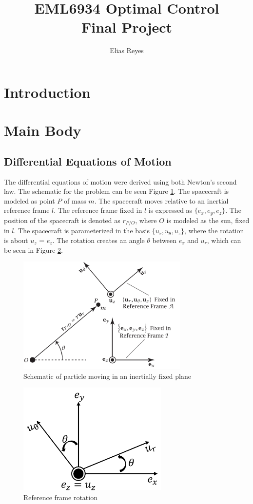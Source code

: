 \documentclass[]{article}
\title{EML6934 Optimal Control \\ Final Project}
\author{Elias Reyes}
\begin{document}
	
	\maketitle
	\thispagestyle{empty}
	\newpage
	\newpage
	\tableofcontents
	\newpage
	\listoffigures
	\listoftables
	\newpage
	\lstlistoflistings
	\newpage
	
	\section{Introduction}
	
	\section{Main Body}
	\subsection{Differential Equations of Motion}
	The differential equations of motion were derived using both Newton's second law. The schematic for the problem can be seen Figure \ref{fig:schematic}. The spacecraft is modeled as point \(P\) of  mass \(m\). The spacecraft moves relative to an inertial reference frame \(l\). The reference frame fixed in \(l\) is expressed as \(\{e_{x},e_{y},e_{z}\}\). The position of the spacecraft is denoted as \(r_{P/O}\), where \(O\) is modeled as the sun, fixed in \(l\). The spacecraft is parameterized in the basis \(\{u_{r},u_{\theta},u_{z}\}\), where the rotation is about \(u_{z}\) = \(e_{z}\). The rotation creates an angle \(\theta\) between \(e_{x}\) and \(u_{r}\), which can be seen in Figure \ref{fig:rotation2}.
	\begin{figure}
		\centering
		\includegraphics[width=85mm,scale=0.85]{midterm_schematic.png}
		\caption{Schematic of particle moving in an inertially fixed plane}
		\label{fig:schematic}
	\end{figure}
	\begin{figure}
		\centering
		\includegraphics[width=75mm,scale=0.75]{rotation.png}
		\caption{Reference frame rotation}
		\label{fig:rotation2}
	\end{figure}
\end{document}
